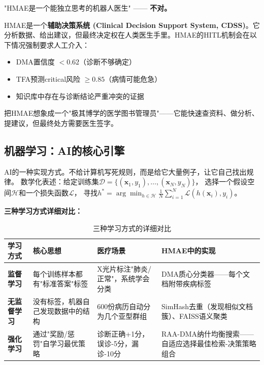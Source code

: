 \documentclass[11pt,a4paper]{ctexart}
\begin{document}
\begin{warnbox}[常见误区]
"HMAE是一个能独立思考的机器人医生" —— \textbf{不对。}

HMAE是一个\textbf{辅助决策系统 (Clinical Decision Support System, CDSS)}。它分析数据、给出建议，但最终决定权在人类医生手里。HMAE的HITL机制会在以下情况强制要求人工介入：
\begin{itemize}[nosep]
\item DMA置信度 $< 0.62$（诊断不够确定）
\item TFA预测critical风险 $\geq 0.85$（病情可能危急）
\item 知识库中存在与诊断结论严重冲突的证据
\end{itemize}
把HMAE想象成一个"极其博学的医学图书管理员"——它能快速查资料、做分析、提建议，但最终处方需要医生签字。
\end{warnbox}

\subsection{机器学习：AI的核心引擎}

\begin{defbox}
AI的一种实现方式。不给计算机写死规则，而是给它大量例子，让它自己找出规律。
数学化表述：给定训练集$\mathcal{D} = \{(\mathbf{x}_1, y_1), \ldots, (\mathbf{x}_N, y_N)\}$，
选择一个假设空间$\mathcal{H}$和一个损失函数$\mathcal{L}$，
寻找$h^* = \arg\min_{h \in \mathcal{H}} \frac{1}{N}\sum_{i=1}^N \mathcal{L}(h(\mathbf{x}_i), y_i)$。
\end{defbox}

\textbf{三种学习方式详细对比：}

\begin{table}[H]
\centering
\small
\begin{tabular}{p{2cm}p{4cm}p{4cm}p{4cm}}
\toprule
\textbf{学习方式} & \textbf{核心思想} & \textbf{医疗场景} & \textbf{HMAE中的实现} \\
\midrule
\textbf{监督学习} & 每个训练样本都有"标准答案"标签 & X光片标注"肺炎/正常"，系统学会分类 & DMA质心分类器——每个文档附带疾病标签 \\
\textbf{无监督学习} & 没有标签，机器自己发现数据中的结构 & 600份病历自动分为几个亚型群组 & SimHash去重（发现相似文档簇）、FAISS语义聚类 \\
\textbf{强化学习} & 通过"奖励/惩罚"自学习最优策略 & 诊断正确+1分，误诊-5分，漏诊-10分 & RAA-DMA纳什均衡搜索——自适应选择最佳检索-决策策略组合 \\
\bottomrule
\end{tabular}
\caption{三种学习方式的详细对比}
\end{table}
\end{document}
